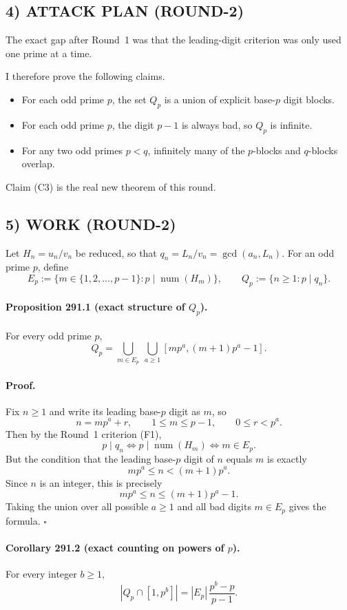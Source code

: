 \subsection*{4) ATTACK PLAN (ROUND-2)}
The exact gap after Round~1 was that the leading-digit criterion was only used one prime at a time.

I therefore prove the following claims.

\begin{itemize}
	\item[(C1)] For each odd prime $p$, the set $Q_p$ is a union of explicit base-$p$ digit blocks.
	\item[(C2)] For each odd prime $p$, the digit $p-1$ is always bad, so $Q_p$ is infinite.
	\item[(C3)] For any two odd primes $p<q$, infinitely many of the $p$-blocks and $q$-blocks overlap.
\end{itemize}

Claim (C3) is the real new theorem of this round.

\subsection*{5) WORK (ROUND-2)}
Let $H_n=u_n/v_n$ be reduced, so that $q_n=L_n/v_n=\gcd(a_n,L_n)$.
For an odd prime $p$, define
\[
E_p:=\{m\in\{1,2,\dots,p-1\}: p\mid \operatorname{num}(H_m)\},
\qquad
Q_p:=\{n\ge 1: p\mid q_n\}.
\]

\paragraph{Proposition 291.1 (exact structure of $Q_p$).}
For every odd prime $p$,
\[
Q_p=\bigcup_{m\in E_p}\ \bigcup_{a\ge 1}[mp^a,(m+1)p^a-1].
\]

\paragraph{Proof.}
Fix $n\ge 1$ and write its leading base-$p$ digit as $m$, so
\[
n=mp^a+r,
\qquad 1\le m\le p-1,
\qquad 0\le r<p^a.
\]
Then by the Round~1 criterion (F1),
\[
p\mid q_n \iff p\mid \operatorname{num}(H_m) \iff m\in E_p.
\]
But the condition that the leading base-$p$ digit of $n$ equals $m$ is exactly
\[
mp^a\le n<(m+1)p^a.
\]
Since $n$ is an integer, this is precisely
\[
mp^a\le n\le (m+1)p^a-1.
\]
Taking the union over all possible $a\ge 1$ and all bad digits $m\in E_p$ gives the formula. \hfill$\square$

\paragraph{Corollary 291.2 (exact counting on powers of $p$).}
For every integer $b\ge 1$,
\[
|Q_p\cap[1,p^b]|=|E_p|\,\frac{p^b-p}{p-1}.
\]

